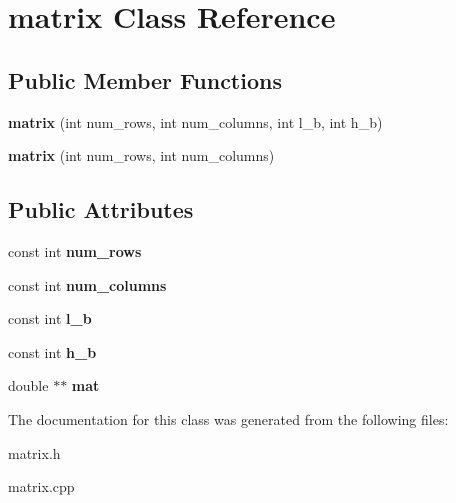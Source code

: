 \section{matrix Class Reference}
\label{classmatrix}
\subsection*{Public Member Functions}
\begin{DoxyCompactItemize}
\item 
\mbox{\label{classmatrix_a2bb2708893087ffb98618c212952dc5e}} 
{\bfseries matrix} (int num\+\_\+rows, int num\+\_\+columns, int l\+\_\+b, int h\+\_\+b)
\item 
\mbox{\label{classmatrix_a727e1cc8355266864b5adf7cb60f5eb0}} 
{\bfseries matrix} (int num\+\_\+rows, int num\+\_\+columns)
\end{DoxyCompactItemize}
\subsection*{Public Attributes}
\begin{DoxyCompactItemize}
\item 
\mbox{\label{classmatrix_a74723e43616696694c630f5a2417e0c2}} 
const int {\bfseries num\+\_\+rows}
\item 
\mbox{\label{classmatrix_a438b799a1055911f085df3aba2f9f5cb}} 
const int {\bfseries num\+\_\+columns}
\item 
\mbox{\label{classmatrix_af8cc7e1cf5ae36cdc7b48dbec2f6a626}} 
const int {\bfseries l\+\_\+b}
\item 
\mbox{\label{classmatrix_a177e57b98003ce6e837dda891c726e84}} 
const int {\bfseries h\+\_\+b}
\item 
\mbox{\label{classmatrix_aa5caffe4dd09d17b93eeb64113b1c8f8}} 
double $\ast$$\ast$ {\bfseries mat}
\end{DoxyCompactItemize}


The documentation for this class was generated from the following files\+:\begin{DoxyCompactItemize}
\item 
matrix.\+h\item 
matrix.\+cpp\end{DoxyCompactItemize}
